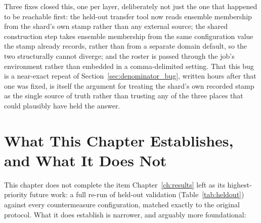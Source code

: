 Three fixes closed this, one per layer, deliberately not just the one
that happened to be reachable first: the held-out transfer tool now reads
ensemble membership from the shard's own stamp rather than any external
source; the shared construction step takes ensemble membership from the
same configuration value the stamp already records, rather than from a
separate domain default, so the two structurally cannot diverge; and the
roster is passed through the job's environment rather than embedded in a
comma-delimited setting. That this bug is a near-exact repeat of
Section~\ref{sec:denominator_bug}, written hours after that one was
fixed, is itself the argument for treating the shard's own recorded stamp
as the single source of truth rather than trusting any of the three
places that could plausibly have held the answer.

\section{What This Chapter Establishes, and What It Does Not}
\label{sec:integrity_conclusion}

This chapter does not complete the item Chapter~\ref{ch:results} left as
its highest-priority future work: a full re-run of held-out validation
(Table~\ref{tab:heldout}) against every countermeasure configuration,
matched exactly to the original protocol. What it does establish is
narrower, and arguably more foundational:

